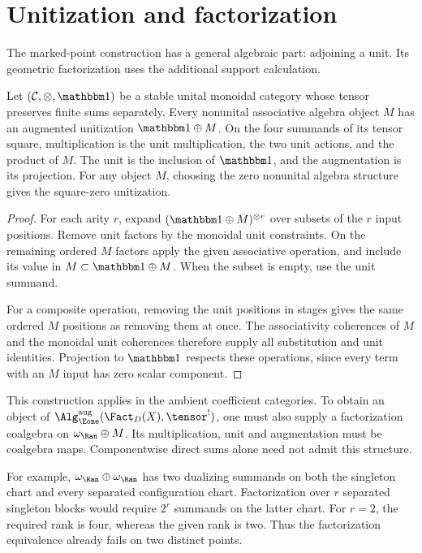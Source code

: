 \section{Unitization and factorization}
The marked-point construction has a general algebraic part: adjoining a unit.
Its geometric factorization uses the additional support calculation.

\begin{proposition}\label{cbc:two:unitization}
Let $(\mathcal C,\otimes,\mathbbm1)$ be a stable unital monoidal category whose tensor preserves finite sums separately.
Every nonunital associative algebra object $M$ has an augmented unitization $\mathbbm1\oplus M$.
On the four summands of its tensor square, multiplication is the unit multiplication, the two unit actions, and the product of $M$.
The unit is the inclusion of $\mathbbm1$, and the augmentation is its projection.
For any object $M$, choosing the zero nonunital algebra structure gives the square-zero unitization.
\end{proposition}
\begin{proof}
For each arity $r$, expand $(\mathbbm1\oplus M)^{\otimes r}$ over subsets of the $r$ input positions.
Remove unit factors by the monoidal unit constraints.
On the remaining ordered $M$ factors apply the given associative operation, and include its value in $M\subset\mathbbm1\oplus M$.
When the subset is empty, use the unit summand.

For a composite operation, removing the unit positions in stages gives the same ordered $M$ positions as removing them at once.
The associativity coherences of $M$ and the monoidal unit coherences therefore supply all substitution and unit identities.
Projection to $\mathbbm1$ respects these operations, since every term with an $M$ input has zero scalar component.
\end{proof}

This construction applies in the ambient coefficient categories.
To obtain an object of $\Alg_{\Eone}^{\mathrm{aug}}(\Fact_D(X),\tensor^!)$, one must also supply a factorization coalgebra on $\omega_{\Ran}\oplus M$.
Its multiplication, unit and augmentation must be coalgebra maps.
Componentwise direct sums alone need not admit this structure.

For example, $\omega_{\Ran}\oplus\omega_{\Ran}$ has two dualizing summands on both the singleton chart and every separated configuration chart.
Factorization over $r$ separated singleton blocks would require $2^r$ summands on the latter chart.
For $r=2$, the required rank is four, whereas the given rank is two.
Thus the factorization equivalence already fails on two distinct points.

